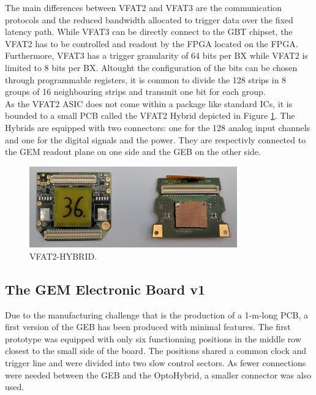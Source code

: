       The main differences between VFAT2 and VFAT3 are the communication protocols and the reduced bandwidth allocated to trigger data over the fixed latency path. While VFAT3 can be directly connect to the GBT chipset, the VFAT2 has to be controlled and readout by the FPGA located on the FPGA. Furthermore, VFAT3 has a trigger granularity of 64 bits per BX while VFAT2 is limited to 8 bits per BX. Altought the configuration of the bits can be chosen through programmable registers, it is common to divide the 128 strips in 8 groups of 16 neighbouring strips and transmit one bit for each group. \\

      As the VFAT2 ASIC does not come within a package like standard ICs, it is bounded to a small PCB called the VFAT2 Hybrid depicted in Figure \ref{fig:II-2-vfat2-hybrid}. The Hybrids are equipped with two connectors: one for the 128 analog input channels and one for the digital signals and the power. They are respectivly connected to the GEM readout plane on one side and the GEB on the other side.

      \begin{figure}[h!]
        \centering
        \includegraphics[width=0.8\textwidth]{img/II-2-daq/vfat2-hybrid.jpg}
        \caption{VFAT2-HYBRID.}
        \label{fig:II-2-vfat2-hybrid}
      \end{figure}

    \subsection{The GEM Electronic Board v1}

      Due to the manufacturing challenge that is the production of a 1-m-long PCB, a first version of the GEB has been produced with minimal features. The first prototype was equipped with only six functionning positions in the middle row closest to the small side of the board. The positions shared a common clock and trigger line and were divided into two slow control sectors. As fewer connections were needed between the GEB and the OptoHybrid, a smaller connector was also used.

